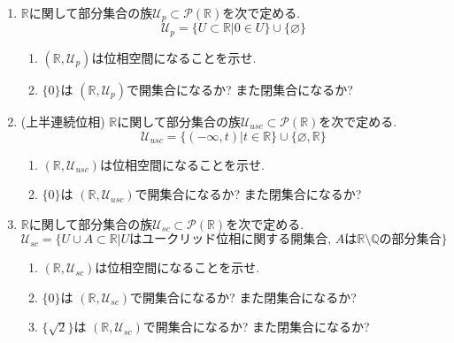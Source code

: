 \documentclass[dvipdfmx,a4paper,11pt]{article}
\newcommand{\R}{\mathbb{R}}
\newcommand{\Q}{\mathbb{Q}}
\theoremstyle{definition}
\begin{document}
\begin{enumerate}[label=\textbf{問}\ref*{sec-open}.\arabic*]
\item \label{point}$\R$に関して部分集合の族$\mathscr{U}_{p} \subset \mathcal{P}(\R)$を次で定める.
$$
\mathscr{U}_{p}  = \{U \subset \R | 0 \in U\}\cup \{  \varnothing  \}
$$
	\begin{enumerate}
	\setlength{\parskip}{0cm}
	\setlength{\itemsep}{0pt} 
	\item $(\R,\mathscr{U}_{p} )$は位相空間になることを示せ. 
	\item $\{ 0\}$は $(\R,\mathscr{U}_{p} )$で開集合になるか? また閉集合になるか?
	\end{enumerate}

\item \label{usc}(上半連続位相) $\R$に関して部分集合の族$\mathscr{U}_{usc} \subset \mathcal{P}(\R)$を次で定める.
$$
\mathscr{U}_{usc} = \{(- \infty,t) | t \in \R \} \cup \{  \varnothing , \R \}
$$
	\begin{enumerate}
	\setlength{\parskip}{0cm}
	\setlength{\itemsep}{0pt} 
	\item $(\R,\mathscr{U}_{usc})$は位相空間になることを示せ. 
	\item $\{ 0\}$は $(\R,\mathscr{U}_{usc})$で開集合になるか? また閉集合になるか?
	\end{enumerate}

		
\item $\R$に関して部分集合の族$\mathscr{U}_{sc} \subset \mathcal{P}(\R)$を次で定める.
$$
\mathscr{U}_{sc}  = \{U \cup A \subset \R | \text{$U$はユークリッド位相に関する開集合, $A$は$\R \setminus \Q$の部分集合}\}
$$
	\begin{enumerate}
	\setlength{\parskip}{0cm}
	\setlength{\itemsep}{0pt} 
	\item $(\R,\mathscr{U}_{sc} )$は位相空間になることを示せ. 
	\item $\{ 0\}$は $(\R,\mathscr{U}_{sc} )$で開集合になるか? また閉集合になるか?
	\item $\{ \sqrt{2}\}$は $(\R,\mathscr{U}_{sc} )$で開集合になるか? また閉集合になるか?
	\end{enumerate}
	

\end{enumerate}
\end{document}
